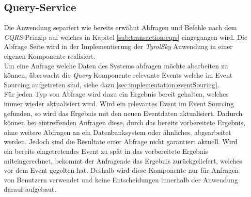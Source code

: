 \subsection{Query-Service}
Die Anwendung separiert wie bereits erwähnt Abfragen und Befehle nach dem \textit{CQRS}-Prinzip auf welches in Kapitel \ref{sub:transaction:cqrs} eingegangen wird. Die Abfrage Seite wird in der Implementierung der \textit{TyrolSky} Anwendung in einer eigenen Komponente realisiert. \\
Um eine Anfrage welche Daten des Systems abfragen möchte  abarbeiten zu können, überwacht die \textit{Query}-Komponente relevante Events welche im Event Sourcing aufgetreten sind, siehe dazu \ref{sec:implementation:eventSouring}. \\
Für jeden Typ von Abfrage wird dazu ein Ergebnis bereit gehalten, welches immer wieder aktualisiert wird. Wird ein relevantes Event im Event Sourcing gefunden, so wird das Ergebnis mit den neuen Eventdaten aktualisiert. Dadurch können bei eintreffenden Anfragen diese, durch das bereits vorbereitete Ergebnis, ohne weitere Abfragen an ein Datenbanksystem oder ähnliches, abgearbeitet werden. Jedoch sind die Resultate einer Abfrage nicht garantiert aktuell. Wird ein bereits eingetretendes Event zu spät in das vorbereitete Ergebnis miteingerechnet, bekommt der Anfragende das Ergebnis zurückgeliefert, welches vor dem Event gegolten hat. Deshalb wird diese Komponente nur für Anfragen von Benutzern verwendet und keine Entscheidungen innerhalb der Anwendung darauf aufgebaut.

